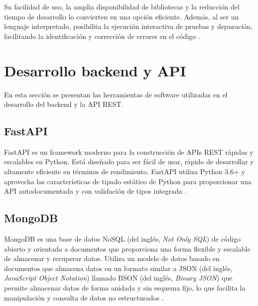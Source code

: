 Su facilidad de uso, la amplia disponibilidad de bibliotecas y la reducción del
tiempo de desarrollo lo convierten en una opción eficiente. Además, al ser un
lenguaje interpretado, posibilita la ejecución interactiva de pruebas y
depuración, facilitando la identificación y corrección de errores en el código
\cite{CTAMicroPython}.


\section{Desarrollo backend y API}

En esta sección se presentan las herramientas de software utilizadas en el
desarrollo del backend y la API REST.

\subsection{FastAPI}

FastAPI es un framework moderno para la construcción de APIs REST rápidas y
escalables en Python. Está diseñado para ser fácil de usar, rápido de
desarrollar y altamente eficiente en términos de rendimiento. FastAPI utiliza
Python 3.6+ y aprovecha las características de tipado estático de Python para
proporcionar una API autodocumentada y con validación de tipos integrada
\cite{FastAPI}.

\subsection{MongoDB}

MongoDB es una base de datos NoSQL (del inglés, \textit{Not Only SQL}) de
código abierto y orientada a documentos que proporciona una forma flexible y
escalable de almacenar y recuperar datos. Utiliza un modelo de datos basado en
documentos que almacena datos en un formato similar a JSON (del inglés,
\textit{JavaScript Object Notation}) llamado BSON (del inglés, \textit{Binary
	JSON}) que permite almacenar datos de forma anidada y sin esquema fijo, lo que
facilita la manipulación y consulta de datos no estructurados \cite{MongoDB}.


